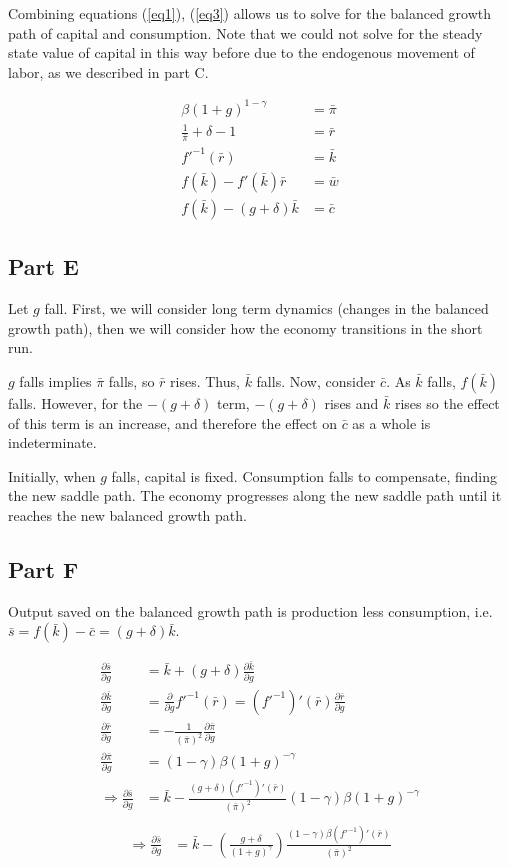 \documentclass[11pt]{article} %
\begin{document}
Combining equations  (\ref{eq1}), (\ref{eq3}) allows us to solve for the balanced growth path of capital and consumption. Note that we could not solve for the steady state value of capital in this way before due to the endogenous movement of labor, as we described in part C.

\begin{align*}
\beta(1+g)^{1-\gamma} &= \bar{\pi}\\
\frac{1}{\bar{\pi}} + \delta - 1 &= \bar{r} \\
 f'^{-1}(\bar{r}) &= \bar{k} \\
 f(\bar{k})  - f'(\bar{k})\bar{r} &= \bar{w} \\
f(\bar{k}) - (g+\delta) \bar{k} &= \bar{c}
\end{align*}

\subsection{Part E}
Let $g$ fall. First, we will consider long term dynamics (changes in the balanced growth path), then we will consider how the economy transitions in the short run.

$g$ falls implies $\bar{\pi}$ falls, so $\bar{r}$ rises. Thus, $\bar{k}$ falls. Now, consider $\bar{c}$. As $\bar{k}$ falls, $f(\bar{k})$ falls. However, for the $-(g+\delta)$ term, $-(g+\delta)$ rises and $\bar{k}$ rises so the effect of this term is an increase, and therefore the effect on $\bar{c}$ as a whole is indeterminate.

Initially, when $g$ falls, capital is fixed. Consumption falls to compensate, finding the new saddle path. The economy progresses along the new saddle path until it reaches the new balanced growth path.

\subsection{Part F}
Output saved on the balanced growth path is production less consumption, i.e. $\bar{s} = f(\bar{k}) - \bar{c} = (g+\delta) \bar{k}$. 

\begin{align*}
\frac{\partial \bar{s}}{\partial g} &= \bar{k} + (g+\delta ) \frac{\partial \bar{k}}{\partial g}\\
 \frac{\partial \bar{k}}{\partial g} &= \frac{\partial }{\partial g} f'^{-1}(\bar{r}) = (f'^{-1})'(\bar{r}) \frac{\partial \bar{r}}{\partial g}\\
\frac{\partial \bar{r}}{\partial g} &= - \frac{1}{(\bar{\pi})^2} \frac{\partial \bar{\pi}}{\partial g} \\
\frac{\partial \bar{\pi}}{\partial g} &= (1-\gamma)\beta (1+g)^{-\gamma} \\
\Rightarrow \frac{\partial \bar{s}}{\partial g} &=  \bar{k} - \frac{ (g+\delta )(f'^{-1})'(\bar{r})}{(\bar{\pi})^2}(1-\gamma)\beta (1+g)^{-\gamma} \\
\end{align*}
\begin{align}
\Rightarrow \frac{\partial \bar{s}}{\partial g} &=  \bar{k} - \left( \frac{g+\delta}{(1+g)^{\gamma}} \right) \frac{(1-\gamma)\beta (f'^{-1})'(\bar{r})}{(\bar{\pi})^2}
\end{align}
\end{document}
